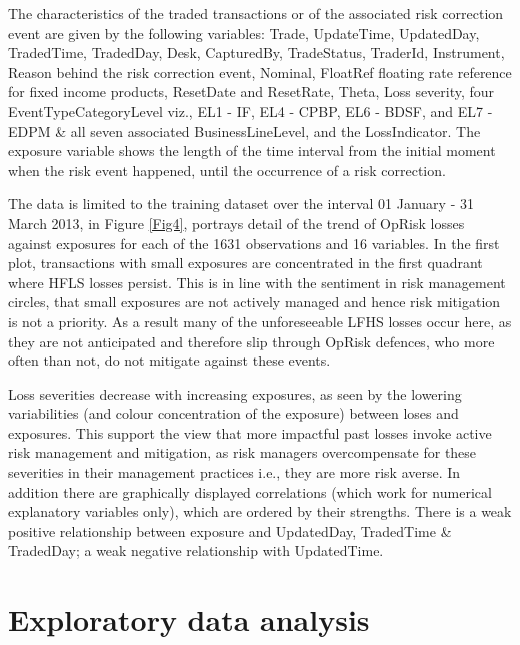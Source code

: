 \documentclass{DissertateUSU}
\begin{document}
The characteristics of the traded transactions or of the associated risk
correction event are given by the following variables: Trade,
UpdateTime, UpdatedDay, TradedTime, TradedDay, Desk, CapturedBy,
TradeStatus, TraderId, Instrument, Reason behind the risk correction
event, Nominal, FloatRef floating rate reference for fixed income
products, ResetDate and ResetRate, Theta, Loss severity, four
EventTypeCategoryLevel viz., EL1 - IF, EL4 - CPBP, EL6 - BDSF, and EL7 -
EDPM \& all seven associated BusinessLineLevel, and the LossIndicator.
The exposure variable shows the length of the time interval from the
initial moment when the risk event happened, until the occurrence of a
risk correction.\medskip

The data is limited to the training dataset over the interval 01 January
- 31 March 2013, in Figure \ref{Fig4}, portrays detail of the trend of
OpRisk losses against exposures for each of the 1631 observations and 16
variables. In the first plot, transactions with small exposures are
concentrated in the first quadrant where HFLS losses persist. This is in
line with the sentiment in risk management circles, that small exposures
are not actively managed and hence risk mitigation is not a priority. As
a result many of the unforeseeable LFHS losses occur here, as they are
not anticipated and therefore slip through OpRisk defences, who more
often than not, do not mitigate against these events.\medskip

Loss severities decrease with increasing exposures, as seen by the
lowering variabilities (and colour concentration of the exposure)
between loses and exposures. This support the view that more impactful
past losses invoke active risk management and mitigation, as risk
managers overcompensate for these severities in their management
practices i.e., they are more risk averse. In addition there are
graphically displayed correlations (which work for numerical explanatory
variables only), which are ordered by their strengths. There is a weak
positive relationship between exposure and UpdatedDay, TradedTime \&
TradedDay; a weak negative relationship with UpdatedTime.

\section{Exploratory data analysis}
\end{document}
